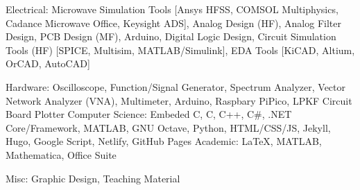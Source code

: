 

\begin{cvskills}

  \cvskill
    {Electrical:} %
    {Microwave Simulation Tools [Ansys HFSS, COMSOL Multiphysics, Cadance Microwave Office, Keysight ADS], Analog Design (HF), Analog Filter Design, PCB Design (MF), Arduino, Digital Logic Design, Circuit Simulation Tools (HF) [SPICE, Multisim, MATLAB/Simulink], EDA Tools [KiCAD, Altium, OrCAD, AutoCAD]} %

\cvskill
    {Hardware:}
    {Oscilloscope, Function/Signal Generator, Spectrum Analyzer, Vector Network Analyzer (VNA), Multimeter, Arduino, Raspbary PiPico, LPKF Circuit Board Plotter }
  \cvskill
    {Computer Science:} %
    {Embeded C, C, C++, C\#, .NET Core/Framework, MATLAB, GNU Octave, Python, HTML/CSS/JS, Jekyll, Hugo, Google Script, Netlify, GitHub Pages} %
  \cvskill
    {Academic:} %
    {\LaTeX, MATLAB, Mathematica, Office Suite} %


  \cvskill
    {Misc:} %
    {Graphic Design, Teaching Material} %
\end{cvskills}
